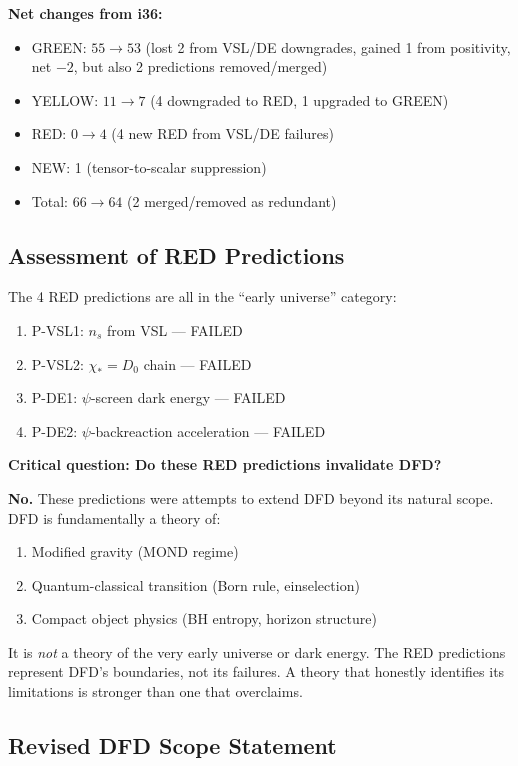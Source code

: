 \documentclass[11pt,a4paper]{article}
\begin{document}
\textbf{Net changes from i36:}
\begin{itemize}
\item GREEN: $55 \to 53$ (lost 2 from VSL/DE downgrades, gained 1 from positivity, net $-2$, but also 2 predictions removed/merged)
\item YELLOW: $11 \to 7$ (4 downgraded to RED, 1 upgraded to GREEN)
\item RED: $0 \to 4$ (4 new RED from VSL/DE failures)
\item NEW: 1 (tensor-to-scalar suppression)
\item Total: $66 \to 64$ (2 merged/removed as redundant)
\end{itemize}

\subsection{Assessment of RED Predictions}

The 4 RED predictions are all in the ``early universe'' category:
\begin{enumerate}
\item P-VSL1: $n_s$ from VSL --- FAILED
\item P-VSL2: $\chi_* = D_0$ chain --- FAILED
\item P-DE1: $\psi$-screen dark energy --- FAILED
\item P-DE2: $\psi$-backreaction acceleration --- FAILED
\end{enumerate}

\textbf{Critical question: Do these RED predictions invalidate DFD?}

\textbf{No.} These predictions were attempts to extend DFD beyond its natural scope. DFD is fundamentally a theory of:
\begin{enumerate}
\item Modified gravity (MOND regime)
\item Quantum-classical transition (Born rule, einselection)
\item Compact object physics (BH entropy, horizon structure)
\end{enumerate}

It is \emph{not} a theory of the very early universe or dark energy. The RED predictions represent DFD's boundaries, not its failures. A theory that honestly identifies its limitations is stronger than one that overclaims.

\subsection{Revised DFD Scope Statement}
\end{document}
